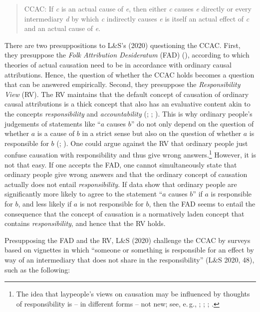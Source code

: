 \documentclass[egregdoesnotlikesansseriftitles,12pt]{scrartcl}
\begin{document}
\begin{quote}
   \textsc{CCAC:} If \textit{c} is an actual cause of \textit{e}, then either \textit{c} causes \textit{e} directly or every intermediary \textit{d} by which \textit{c} indirectly causes \textit{e} is itself an actual effect of \textit{c} and an actual cause of \textit{e}.
\end{quote}

\noindent There are two presuppositions to L\&S's (2020) questioning the CCAC. First, they presuppose the \textit{Folk Attribution Desideratum} (FAD) (\cite{livengood_following_2017}), according to which theories of actual causation need to be in accordance with ordinary causal attributions. Hence, the question of whether the CCAC holds becomes a question that can be answered empirically. Second, they presuppose the \textit{Responsibility View} (RV). The RV maintains that the default concept of causation of ordinary causal attributions is a thick concept that also has an evaluative content akin to the concepts \textit{responsibility} and \textit{accountability} (\cite{fischer_causal_2019}; \cite{livengood_following_2017}; \cite{sytsma_two_2012}). This is why ordinary people's judgements of statements like ``$a$ causes $b$'' do not only depend on the question of whether $a$ is a cause of $b$ in a strict sense but also on the question of whether $a$ is responsible for $b$ (\cite{livengood_following_2017}; \cite{knobe_causal_2008}). One could argue against the RV that ordinary people just confuse causation with responsibility and thus give wrong answers.\footnote{The idea that laypeople's views on causation may be influenced by thoughts of responsibility is -- in different forms -- not new; see, e.\,g., \citet{alicke_causation_2011}; \citet{danks_demoralizing_2014}; \citet{samland_how_2016}; \citet{sytsma_causation_2020,sytsma_crossed_2021}.} However, it is not that easy. If one accepts the FAD, one cannot simultaneously state that ordinary people give wrong answers and that the ordinary concept of causation actually does not entail \textit{responsibility}. If data show that ordinary people are significantly more likely to agree to the statement ``$a$ causes $b$'' if $a$ is responsible for $b$, and less likely if $a$ is not responsible for $b$, then the FAD seems to entail the consequence that the concept of causation is a normatively laden concept that contains \textit{responsibility}, and hence that the RV holds.

Presupposing the FAD and the RV, L\&S (2020) challenge the CCAC by surveys based on vignettes in which ``someone or something is responsible for an effect by way of an intermediary that does not share in the responsibility'' (L\&S 2020, 48), such as the following:
\end{document}
